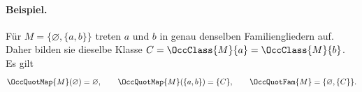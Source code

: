 \documentclass[main.tex]{subfiles}
\begin{document}
\paragraph{Beispiel.}
Für \(M=\{\varnothing,\{a,b\}\}\) treten \(a\) und \(b\) in genau denselben
Familiengliedern auf. Daher bilden sie dieselbe Klasse
\(C=\OccClass{M}{a}=\OccClass{M}{b}\). Es gilt
\[
  \OccQuotMap{M}(\varnothing)=\varnothing,\qquad
  \OccQuotMap{M}(\{a,b\})=\{C\},
  \qquad
  \OccQuotFam{M}=\{\varnothing,\{C\}\}.
\]
\end{document}
